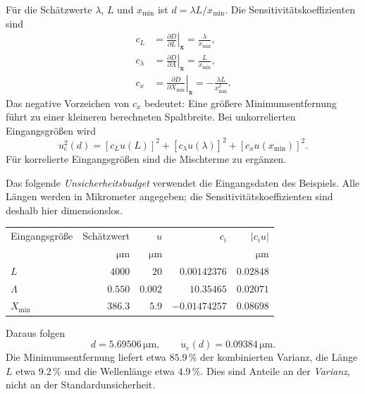 Für die Schätzwerte $\lambda$, $L$ und $x_{\mathrm{min}}$ ist
$d=\lambda L/x_{\mathrm{min}}$. Die Sensitivitätskoeffizienten sind
\begin{equation}
\begin{aligned}
c_L&=\left.\frac{\partial D}{\partial L}\right|_{\mathbf x}
=\frac{\lambda}{x_{\mathrm{min}}},\\
c_\lambda&=\left.\frac{\partial D}{\partial\Lambda}\right|_{\mathbf x}
=\frac{L}{x_{\mathrm{min}}},\\
c_x&=\left.\frac{\partial D}{\partial X_{\mathrm{min}}}\right|_{\mathbf x}
=-\frac{\lambda L}{x_{\mathrm{min}}^2}.
\end{aligned}
\end{equation}
Das negative Vorzeichen von $c_x$ bedeutet: Eine größere
Minimumsentfernung führt zu einer kleineren berechneten Spaltbreite.
Bei unkorrelierten Eingangsgrößen wird
\begin{equation}
u_{\mathrm c}^2(d)=[c_Lu(L)]^2+[c_\lambda u(\lambda)]^2+
[c_xu(x_{\mathrm{min}})]^2.
\end{equation}
Für korrelierte Eingangsgrößen sind die Mischterme zu ergänzen.

Das folgende \textsl{Unsicherheitsbudget} verwendet die Eingangsdaten des
Beispiels. Alle Längen werden in Mikrometer angegeben; die
Sensitivitätskoeffizienten sind deshalb hier dimensionslos.
\begin{center}
\small
\setlength{\tabcolsep}{5pt}
\renewcommand{\arraystretch}{1.4}
\begin{tabular}{lrrrr}
\hline
Eingangsgröße & Schätzwert & $u$ & $c_i$ & $|c_i u|$\\
 & $\mathrm{\mu m}$ & $\mathrm{\mu m}$ & & $\mathrm{\mu m}$\\
\hline
$L$ & $4000$ & $20$ & $0.00142376$ & $0.02848$\\
$\Lambda$ & $0.550$ & $0.002$ & $10.35465$ & $0.02071$\\
$X_{\mathrm{min}}$ & $386.3$ & $5.9$ & $-0.01474257$ & $0.08698$\\
\hline
\end{tabular}
\end{center}
Daraus folgen
\begin{equation}
d=5.69506\,\mathrm{\mu m},\qquad
u_{\mathrm c}(d)=0.09384\,\mathrm{\mu m}.
\end{equation}
Die Minimumsentfernung liefert etwa $85.9\,\%$ der kombinierten Varianz,
die Länge $L$ etwa $9.2\,\%$ und die Wellenlänge etwa $4.9\,\%$.
Dies sind Anteile an der \emph{Varianz}, nicht an der Standardunsicherheit.

